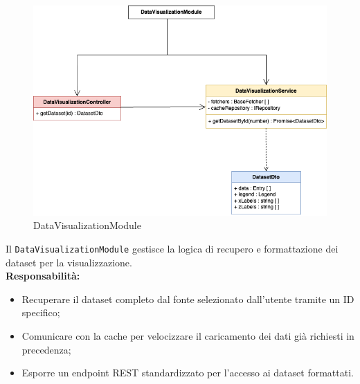\begin{figure}[H] 
    \centering
    \includegraphics[scale = 0.5]{template/images/uml_back/DataVisModule.png}
    \caption{DataVisualizationModule}
\end{figure}

Il \texttt{DataVisualizationModule} gestisce la logica di recupero e formattazione dei dataset per la visualizzazione.\\

\textbf{Responsabilità:}
\begin{itemize}
    \item Recuperare il dataset completo dal fonte selezionato dall'utente tramite un ID specifico;
    \item Comunicare con la cache per velocizzare il caricamento dei dati già richiesti in precedenza;
    \item Esporre un endpoint REST standardizzato per l'accesso ai dataset formattati.
\end{itemize}


